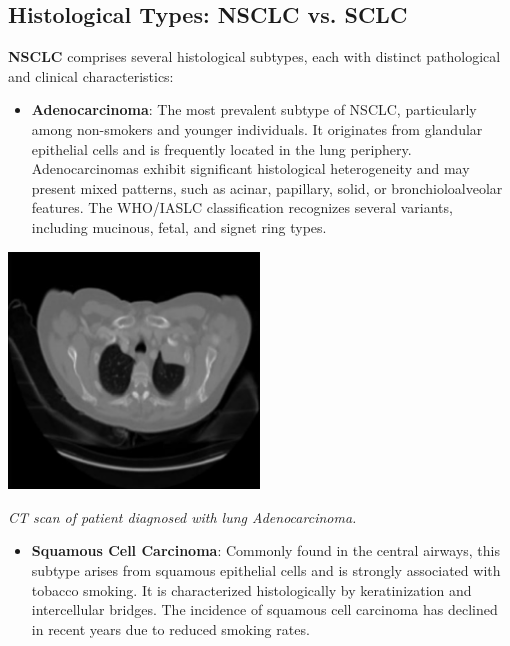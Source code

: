 \subsection{Histological Types: NSCLC vs. SCLC}

\textbf{NSCLC} comprises several histological subtypes, each with distinct pathological and clinical 
characteristics:

\begin{itemize}
    \item \textbf{Adenocarcinoma}: The most prevalent subtype of NSCLC, particularly among 
    non-smokers and younger individuals. It originates from glandular epithelial cells and is 
    frequently located in the lung periphery. Adenocarcinomas exhibit significant histological 
    heterogeneity and may present mixed patterns, such as acinar, papillary, solid, or 
    bronchioloalveolar features. The WHO/IASLC classification recognizes several variants, including 
    mucinous, fetal, and signet ring types. \cite{nlm2025}
\end{itemize}

\vspace{1em}
\begin{center}
    \includegraphics[width=0.5\textwidth]{../assets/01-overview/lc-adc-ct.jpeg}

    \small\textit{CT scan of patient diagnosed with lung Adenocarcinoma. \cite{SHATNAWI2025100188}}
\end{center}
\vspace{1em}

\begin{itemize}
    \item \textbf{Squamous Cell Carcinoma}: Commonly found in the central airways, this subtype 
    arises from squamous epithelial cells and is strongly associated with tobacco smoking. It is 
    characterized histologically by keratinization and intercellular bridges. The incidence of 
    squamous cell carcinoma has declined in recent years due to reduced smoking rates. 
    \cite{nlm2025}
\end{itemize}

